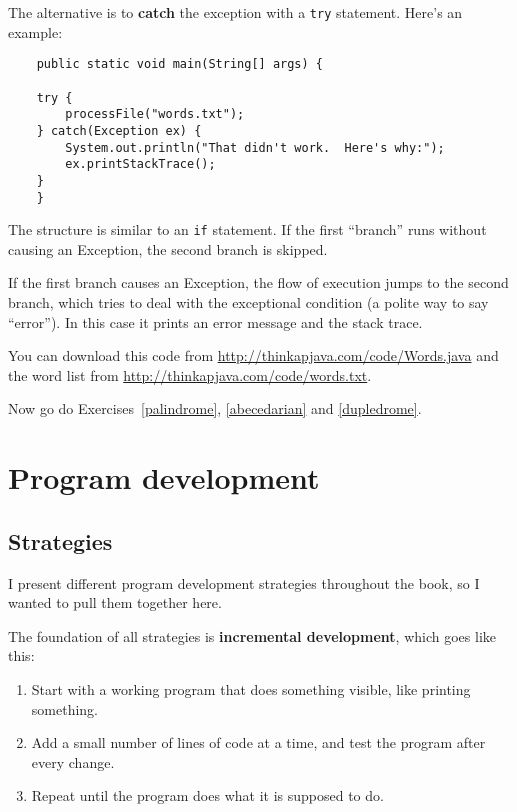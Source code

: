 \documentclass[12pt]{book}
\theoremstyle{definition}
\begin{document}
The alternative is to {\bf catch} the exception with a
{\tt try} statement.  Here's an example:

\begin{lstlisting}
    public static void main(String[] args) {
	
	try {
	    processFile("words.txt");
	} catch(Exception ex) {
	    System.out.println("That didn't work.  Here's why:");
	    ex.printStackTrace();
	}
    }
\end{lstlisting}

The structure is similar to an {\tt if} statement.  If the first
``branch'' runs without causing an Exception, the second branch
is skipped.

If the first branch causes an Exception, the flow of execution jumps
to the second branch, which tries to deal with the exceptional
condition (a polite way to say ``error'').  In this case it prints
an error message and the stack trace.

You can download this code from
\url{http://thinkapjava.com/code/Words.java}
and the word list from
\url{http://thinkapjava.com/code/words.txt}.

Now go do Exercises~\ref{palindrome}, \ref{abecedarian} and \ref{dupledrome}.



\chapter{Program development}
\label{development}

\section{Strategies}

I present different program development strategies throughout
the book, so I wanted to pull them together here.

The foundation of all strategies is {\bf incremental development},
which goes like this:

\begin{enumerate}

\item Start with a working program that does something visible,
   like printing something.

\item Add a small number of lines of code at a time,
   and test the program after every change.

\item Repeat until the program does what it is supposed to do.

\end{enumerate}
\end{document}
